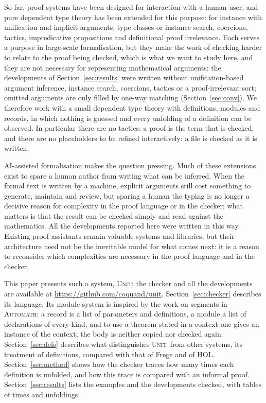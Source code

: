 \documentclass[11pt]{article}
\newcommand{\sys}{\textsc{Unit}}
\begin{document}
So far, proof systems have been designed for interaction with a human
user, and pure dependent type theory has been extended for this purpose:
for instance with unification and implicit arguments, type classes
or instance search, coercions, tactics, impredicative propositions and
definitional proof irrelevance. Each serves a purpose in large-scale
formalisation, but they make the work of checking harder to relate to
the proof being checked, which is what we want to study here, and they
are not necessary for representing mathematical arguments: the
developments of Section~\ref{sec:results} were written without
unification-based argument inference, instance search, coercions,
tactics or a proof-irrelevant sort; omitted arguments are only filled by
one-way matching (Section~\ref{sec:conv}). We
therefore work with a small dependent type theory with definitions,
modules and records, in which nothing is guessed and every unfolding of
a definition can be observed. In particular there are no tactics: a proof is the term that is
checked; and there are no placeholders to be refined interactively: a
file is checked as it is written.

AI-assisted formalisation makes the question pressing. Much of these
extensions exist to spare a human author from writing what can be
inferred. When the formal text is written by a machine, explicit
arguments still cost something to generate, maintain and review, but
sparing a human the typing is no longer a decisive reason for
complexity in the proof language or in the checker; what matters is
that the result can be checked simply and read against the
mathematics. All the developments
reported here were written in this way. Existing proof assistants remain
valuable systems and libraries, but their architecture need not be the
inevitable model for what comes next: it is a reason to reconsider which
complexities are necessary in the proof language and in the checker.

This paper presents such a system, \sys; the checker and all the
developments are available at \url{https://github.com/coquand/unit}.
Section~\ref{sec:checker} describes its language. Its module system
is inspired by the work on segments in \textsc{Automath}: a record is a list of
parameters and definitions, a module a list of declarations of every
kind, and to use a theorem stated in a context one gives an instance of
the context; the body is neither copied nor checked again.
Section~\ref{sec:defs} describes what distinguishes \sys\ from other
systems, its treatment of definitions, compared with that of Frege and
of HOL. Section~\ref{sec:method} shows how the checker traces how many
times each definition is unfolded, and how this trace is compared with
an informal proof. Section~\ref{sec:results} lists the examples and the
developments checked, with tables of times and unfoldings.
\end{document}
